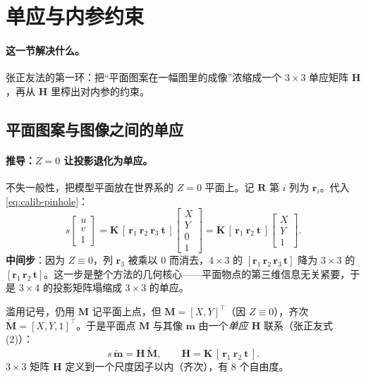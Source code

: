 \section{单应与内参约束}
\label{sec:calib-homography}

\paragraph{这一节解决什么。}
张正友法的第一环：把“平面图案在一幅图里的成像”浓缩成一个 $3\times3$ 单应矩阵 $\mathbf{H}$，再从 $\mathbf{H}$ 里榨出对内参的约束。

\subsection{平面图案与图像之间的单应}
\label{sec:calib-homography-derive}

\paragraph{推导：$Z=0$ 让投影退化为单应。}
不失一般性，把模型平面放在世界系的 $Z=0$ 平面上。记 $\mathbf{R}$ 第 $i$ 列为 $\mathbf{r}_i$。代入 \cref{eq:calib-pinhole}\cite{zhang2000calibration}：
\begin{equation}
  s\begin{bmatrix}u\\v\\1\end{bmatrix}
  =\mathbf{K}\,[\,\mathbf{r}_1\ \mathbf{r}_2\ \mathbf{r}_3\ \mathbf{t}\,]\begin{bmatrix}X\\Y\\0\\1\end{bmatrix}
  =\mathbf{K}\,[\,\mathbf{r}_1\ \mathbf{r}_2\ \mathbf{t}\,]\begin{bmatrix}X\\Y\\1\end{bmatrix}.
  \label{eq:calib-z0}
\end{equation}
\textbf{中间步}：因为 $Z\equiv0$，列 $\mathbf{r}_3$ 被乘以 $0$ 而消去，$4\times3$ 的 $[\mathbf{r}_1\,\mathbf{r}_2\,\mathbf{r}_3\,\mathbf{t}]$ 降为 $3\times3$ 的 $[\mathbf{r}_1\,\mathbf{r}_2\,\mathbf{t}]$。这一步是整个方法的几何核心——平面物点的第三维信息无关紧要，于是 $3\times4$ 的投影矩阵塌缩成 $3\times3$ 的单应。

滥用记号，仍用 $\mathbf{M}$ 记平面上点，但 $\mathbf{M}=[X,Y]^\top$（因 $Z\equiv0$），齐次 $\tilde{\mathbf{M}}=[X,Y,1]^\top$。于是平面点 $\mathbf{M}$ 与其像 $\mathbf{m}$ 由一个\emph{单应 $\mathbf{H}$} 联系（张正友式 (2)\cite{zhang2000calibration}）：
\begin{equation}
  s\,\tilde{\mathbf{m}} = \mathbf{H}\,\tilde{\mathbf{M}},
  \qquad
  \mathbf{H}=\mathbf{K}\,[\,\mathbf{r}_1\ \mathbf{r}_2\ \mathbf{t}\,].
  \label{eq:calib-homography}
\end{equation}
$3\times3$ 矩阵 $\mathbf{H}$ 定义到一个尺度因子以内（齐次），有 $8$ 个自由度。

